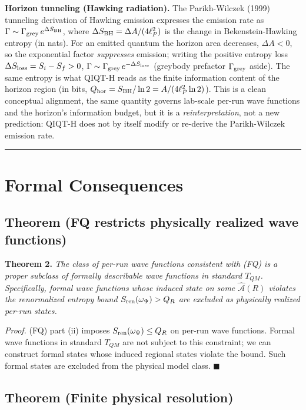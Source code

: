 \documentclass[11pt,a4paper]{article}
\begin{document}
\textbf{Horizon tunneling (Hawking radiation).} The Parikh-Wilczek (1999) tunneling derivation of Hawking emission expresses the emission rate as $\Gamma \sim \Gamma_{\rm grey}\, e^{\Delta S_{\rm BH}}$, where $\Delta S_{\rm BH} = \Delta A/(4\ell_P^2)$ is the change in Bekenstein-Hawking entropy (in nats). For an emitted quantum the horizon area decreases, $\Delta A < 0$, so the exponential factor \emph{suppresses} emission; writing the positive entropy loss $\Delta S_{\rm loss} = S_i - S_f > 0$, $\Gamma \sim \Gamma_{\rm grey}\, e^{-\Delta S_{\rm loss}}$ (greybody prefactor $\Gamma_{\rm grey}$ aside). The same entropy is what QIQT-H reads as the finite information content of the horizon region (in bits, $Q_{\rm hor} = S_{\rm BH}/\ln 2 = A/(4\ell_P^2 \ln 2)$). This is a clean conceptual alignment, the same quantity governs lab-scale per-run wave functions and the horizon's information budget, but it is a \emph{reinterpretation}, not a new prediction: QIQT-H does not by itself modify or re-derive the Parikh-Wilczek emission rate.

\medskip\hrule\medskip

\section{Formal Consequences}

\subsection{Theorem (FQ restricts physically realized wave functions)}

\textbf{Theorem 2.} \emph{The class of per-run wave functions consistent with (FQ) is a proper subclass of formally describable wave functions in standard $T_{QM}$. Specifically, formal wave functions whose induced state on some $\hat{\mathcal{A}}(R)$ violates the renormalized entropy bound $S_{\rm ren}(\omega_\Psi) > Q_R$ are excluded as physically realized per-run states.}

\emph{Proof.} (FQ) part (ii) imposes $S_{\rm ren}(\omega_\Psi) \le Q_R$ on per-run wave functions. Formal wave functions in standard $T_{QM}$ are not subject to this constraint; we can construct formal states whose induced regional states violate the bound. Such formal states are excluded from the physical model class. $\blacksquare$

\subsection{Theorem (Finite physical resolution)}
\end{document}
